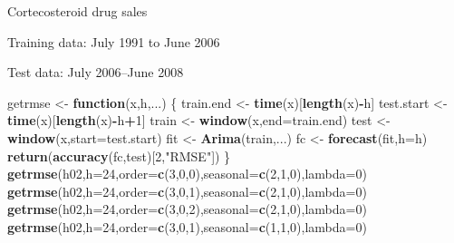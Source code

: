 \documentclass[14pt,ignorenonframetext,]{beamer}
\newenvironment{Shaded}{\begin{snugshade}}{\end{snugshade}}
\newcommand{\KeywordTok}[1]{\textcolor[rgb]{0.13,0.29,0.53}{\textbf{#1}}}
\newcommand{\DataTypeTok}[1]{\textcolor[rgb]{0.13,0.29,0.53}{#1}}
\newcommand{\DecValTok}[1]{\textcolor[rgb]{0.00,0.00,0.81}{#1}}
\newcommand{\StringTok}[1]{\textcolor[rgb]{0.31,0.60,0.02}{#1}}
\newcommand{\ControlFlowTok}[1]{\textcolor[rgb]{0.13,0.29,0.53}{\textbf{#1}}}
\newcommand{\OperatorTok}[1]{\textcolor[rgb]{0.81,0.36,0.00}{\textbf{#1}}}
\newcommand{\NormalTok}[1]{#1}
\begin{document}
\begin{frame}[fragile]{Cortecosteroid drug sales}

\fontsize{10}{12}\sf

Training data: July 1991 to June 2006

Test data: July 2006--June 2008

\begin{Shaded}
\begin{Highlighting}[]
\NormalTok{getrmse <-}\StringTok{ }\ControlFlowTok{function}\NormalTok{(x,h,...)}
\NormalTok{\{}
\NormalTok{  train.end <-}\StringTok{ }\KeywordTok{time}\NormalTok{(x)[}\KeywordTok{length}\NormalTok{(x)}\OperatorTok{-}\NormalTok{h]}
\NormalTok{  test.start <-}\StringTok{ }\KeywordTok{time}\NormalTok{(x)[}\KeywordTok{length}\NormalTok{(x)}\OperatorTok{-}\NormalTok{h}\OperatorTok{+}\DecValTok{1}\NormalTok{]}
\NormalTok{  train <-}\StringTok{ }\KeywordTok{window}\NormalTok{(x,}\DataTypeTok{end=}\NormalTok{train.end)}
\NormalTok{  test <-}\StringTok{ }\KeywordTok{window}\NormalTok{(x,}\DataTypeTok{start=}\NormalTok{test.start)}
\NormalTok{  fit <-}\StringTok{ }\KeywordTok{Arima}\NormalTok{(train,...)}
\NormalTok{  fc <-}\StringTok{ }\KeywordTok{forecast}\NormalTok{(fit,}\DataTypeTok{h=}\NormalTok{h)}
  \KeywordTok{return}\NormalTok{(}\KeywordTok{accuracy}\NormalTok{(fc,test)[}\DecValTok{2}\NormalTok{,}\StringTok{"RMSE"}\NormalTok{])}
\NormalTok{\}}
\KeywordTok{getrmse}\NormalTok{(h02,}\DataTypeTok{h=}\DecValTok{24}\NormalTok{,}\DataTypeTok{order=}\KeywordTok{c}\NormalTok{(}\DecValTok{3}\NormalTok{,}\DecValTok{0}\NormalTok{,}\DecValTok{0}\NormalTok{),}\DataTypeTok{seasonal=}\KeywordTok{c}\NormalTok{(}\DecValTok{2}\NormalTok{,}\DecValTok{1}\NormalTok{,}\DecValTok{0}\NormalTok{),}\DataTypeTok{lambda=}\DecValTok{0}\NormalTok{)}
\KeywordTok{getrmse}\NormalTok{(h02,}\DataTypeTok{h=}\DecValTok{24}\NormalTok{,}\DataTypeTok{order=}\KeywordTok{c}\NormalTok{(}\DecValTok{3}\NormalTok{,}\DecValTok{0}\NormalTok{,}\DecValTok{1}\NormalTok{),}\DataTypeTok{seasonal=}\KeywordTok{c}\NormalTok{(}\DecValTok{2}\NormalTok{,}\DecValTok{1}\NormalTok{,}\DecValTok{0}\NormalTok{),}\DataTypeTok{lambda=}\DecValTok{0}\NormalTok{)}
\KeywordTok{getrmse}\NormalTok{(h02,}\DataTypeTok{h=}\DecValTok{24}\NormalTok{,}\DataTypeTok{order=}\KeywordTok{c}\NormalTok{(}\DecValTok{3}\NormalTok{,}\DecValTok{0}\NormalTok{,}\DecValTok{2}\NormalTok{),}\DataTypeTok{seasonal=}\KeywordTok{c}\NormalTok{(}\DecValTok{2}\NormalTok{,}\DecValTok{1}\NormalTok{,}\DecValTok{0}\NormalTok{),}\DataTypeTok{lambda=}\DecValTok{0}\NormalTok{)}
\KeywordTok{getrmse}\NormalTok{(h02,}\DataTypeTok{h=}\DecValTok{24}\NormalTok{,}\DataTypeTok{order=}\KeywordTok{c}\NormalTok{(}\DecValTok{3}\NormalTok{,}\DecValTok{0}\NormalTok{,}\DecValTok{1}\NormalTok{),}\DataTypeTok{seasonal=}\KeywordTok{c}\NormalTok{(}\DecValTok{1}\NormalTok{,}\DecValTok{1}\NormalTok{,}\DecValTok{0}\NormalTok{),}\DataTypeTok{lambda=}\DecValTok{0}\NormalTok{)}

\end{Highlighting}
\end{Shaded}
\end{frame}
\end{document}
